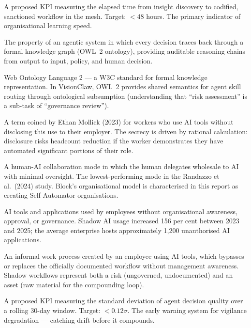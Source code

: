 \begin{description}[style=nextline, leftmargin=2em, font=\bfseries\color{navyblue}]
\item[Mesh Velocity (MV)]
A proposed KPI measuring the elapsed time from insight discovery to codified, sanctioned workflow in the mesh. Target: $<48$ hours. The primary indicator of organisational learning speed.

\item[Ontological Provenance]
The property of an agentic system in which every decision traces back through a formal knowledge graph (OWL~2 ontology), providing auditable reasoning chains from output to input, policy, and human decision.

\item[OWL~2]
Web Ontology Language 2 --- a W3C standard for formal knowledge representation. In VisionClaw, OWL~2 provides shared semantics for agent skill routing through ontological subsumption (understanding that ``risk assessment'' is a sub-task of ``governance review'').

\item[Secret Cyborg]
A term coined by Ethan Mollick (2023) for workers who use AI tools without disclosing this use to their employer. The secrecy is driven by rational calculation: disclosure risks headcount reduction if the worker demonstrates they have automated significant portions of their role.

\item[Self-Automator]
A human-AI collaboration mode in which the human delegates wholesale to AI with minimal oversight. The lowest-performing mode in the Randazzo et al.\ (2024) study. Block's organisational model is characterised in this report as creating Self-Automator organisations.

\item[Shadow AI]
AI tools and applications used by employees without organisational awareness, approval, or governance. Shadow AI usage increased 156 per cent between 2023 and 2025; the average enterprise hosts approximately 1,200 unauthorised AI applications.

\item[Shadow Workflow]
An informal work process created by an employee using AI tools, which bypasses or replaces the officially documented workflow without management awareness. Shadow workflows represent both a risk (ungoverned, undocumented) and an asset (raw material for the compounding loop).

\item[Trust Variance (TV)]
A proposed KPI measuring the standard deviation of agent decision quality over a rolling 30-day window. Target: $<0.12\sigma$. The early warning system for vigilance degradation --- catching drift before it compounds.


\end{description}
